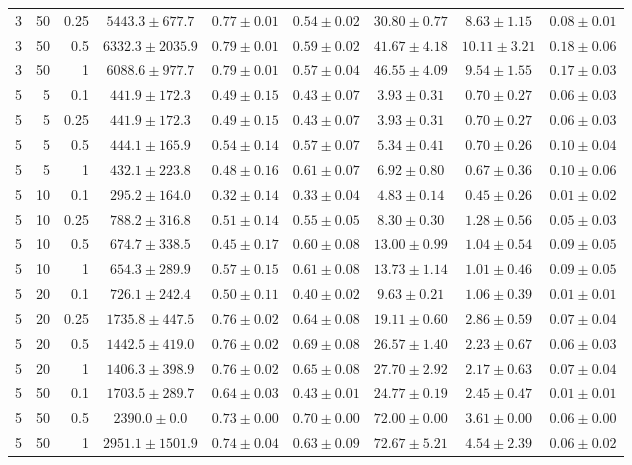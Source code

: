 \begin{table}[htbp]
\begin{tabular}{@{}rrrcccccc@{}}
3 & 50 & 0.25 & $5443.3 \pm 677.7$ & $0.77 \pm 0.01$ & $0.54 \pm 0.02$ & $30.80 \pm 0.77$ & $8.63 \pm 1.15$ & $0.08 \pm 0.01$ \\
3 & 50 & 0.5 & $6332.3 \pm 2035.9$ & $0.79 \pm 0.01$ & $0.59 \pm 0.02$ & $41.67 \pm 4.18$ & $10.11 \pm 3.21$ & $0.18 \pm 0.06$ \\
3 & 50 & 1 & $6088.6 \pm 977.7$ & $0.79 \pm 0.01$ & $0.57 \pm 0.04$ & $46.55 \pm 4.09$ & $9.54 \pm 1.55$ & $0.17 \pm 0.03$ \\
\midrule
5 & 5 & 0.1 & $441.9 \pm 172.3$ & $0.49 \pm 0.15$ & $0.43 \pm 0.07$ & $3.93 \pm 0.31$ & $0.70 \pm 0.27$ & $0.06 \pm 0.03$ \\
5 & 5 & 0.25 & $441.9 \pm 172.3$ & $0.49 \pm 0.15$ & $0.43 \pm 0.07$ & $3.93 \pm 0.31$ & $0.70 \pm 0.27$ & $0.06 \pm 0.03$ \\
5 & 5 & 0.5 & $444.1 \pm 165.9$ & $0.54 \pm 0.14$ & $0.57 \pm 0.07$ & $5.34 \pm 0.41$ & $0.70 \pm 0.26$ & $0.10 \pm 0.04$ \\
5 & 5 & 1 & $432.1 \pm 223.8$ & $0.48 \pm 0.16$ & $0.61 \pm 0.07$ & $6.92 \pm 0.80$ & $0.67 \pm 0.36$ & $0.10 \pm 0.06$ \\
5 & 10 & 0.1 & $295.2 \pm 164.0$ & $0.32 \pm 0.14$ & $0.33 \pm 0.04$ & $4.83 \pm 0.14$ & $0.45 \pm 0.26$ & $0.01 \pm 0.02$ \\
5 & 10 & 0.25 & $788.2 \pm 316.8$ & $0.51 \pm 0.14$ & $0.55 \pm 0.05$ & $8.30 \pm 0.30$ & $1.28 \pm 0.56$ & $0.05 \pm 0.03$ \\
5 & 10 & 0.5 & $674.7 \pm 338.5$ & $0.45 \pm 0.17$ & $0.60 \pm 0.08$ & $13.00 \pm 0.99$ & $1.04 \pm 0.54$ & $0.09 \pm 0.05$ \\
5 & 10 & 1 & $654.3 \pm 289.9$ & $0.57 \pm 0.15$ & $0.61 \pm 0.08$ & $13.73 \pm 1.14$ & $1.01 \pm 0.46$ & $0.09 \pm 0.05$ \\
5 & 20 & 0.1 & $726.1 \pm 242.4$ & $0.50 \pm 0.11$ & $0.40 \pm 0.02$ & $9.63 \pm 0.21$ & $1.06 \pm 0.39$ & $0.01 \pm 0.01$ \\
5 & 20 & 0.25 & $1735.8 \pm 447.5$ & $0.76 \pm 0.02$ & $0.64 \pm 0.08$ & $19.11 \pm 0.60$ & $2.86 \pm 0.59$ & $0.07 \pm 0.04$ \\
5 & 20 & 0.5 & $1442.5 \pm 419.0$ & $0.76 \pm 0.02$ & $0.69 \pm 0.08$ & $26.57 \pm 1.40$ & $2.23 \pm 0.67$ & $0.06 \pm 0.03$ \\
5 & 20 & 1 & $1406.3 \pm 398.9$ & $0.76 \pm 0.02$ & $0.65 \pm 0.08$ & $27.70 \pm 2.92$ & $2.17 \pm 0.63$ & $0.07 \pm 0.04$ \\
5 & 50 & 0.1 & $1703.5 \pm 289.7$ & $0.64 \pm 0.03$ & $0.43 \pm 0.01$ & $24.77 \pm 0.19$ & $2.45 \pm 0.47$ & $0.01 \pm 0.01$ \\
5 & 50 & 0.5 & $2390.0 \pm 0.0$ & $0.73 \pm 0.00$ & $0.70 \pm 0.00$ & $72.00 \pm 0.00$ & $3.61 \pm 0.00$ & $0.06 \pm 0.00$ \\
5 & 50 & 1 & $2951.1 \pm 1501.9$ & $0.74 \pm 0.04$ & $0.63 \pm 0.09$ & $72.67 \pm 5.21$ & $4.54 \pm 2.39$ & $0.06 \pm 0.02$ \\
\bottomrule
\end{tabular}
\end{table}
